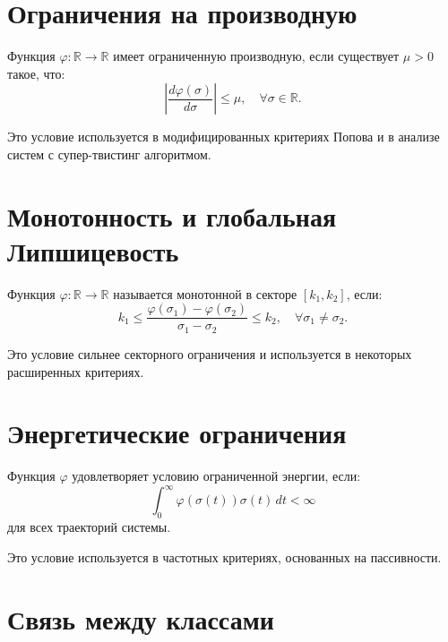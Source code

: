 \section{Ограничения на производную}

\begin{definition}
Функция $\varphi:\mathbb{R}\to\mathbb{R}$ имеет ограниченную производную, если существует $\mu>0$ такое, что:
\begin{equation}
    \left|\frac{d\varphi(\sigma)}{d\sigma}\right| \le \mu, \quad \forall \sigma\in\mathbb{R}.
\end{equation}
\end{definition}

Это условие используется в модифицированных критериях Попова и в анализе систем с супер-твистинг алгоритмом.

\section{Монотонность и глобальная Липшицевость}

\begin{definition}
Функция $\varphi:\mathbb{R}\to\mathbb{R}$ называется монотонной в секторе $[k_1, k_2]$, если:
\begin{equation}
    k_1 \le \frac{\varphi(\sigma_1) - \varphi(\sigma_2)}{\sigma_1 - \sigma_2} \le k_2, \quad \forall \sigma_1\ne\sigma_2.
\end{equation}
\end{definition}

Это условие сильнее секторного ограничения и используется в некоторых расширенных критериях.

\section{Энергетические ограничения}

\begin{definition}
Функция $\varphi$ удовлетворяет условию ограниченной энергии, если:
\begin{equation}
    \int_0^\infty \varphi(\sigma(t))\sigma(t)\,dt < \infty
\end{equation}
для всех траекторий системы.
\end{definition}

Это условие используется в частотных критериях, основанных на пассивности.

\section{Связь между классами}

